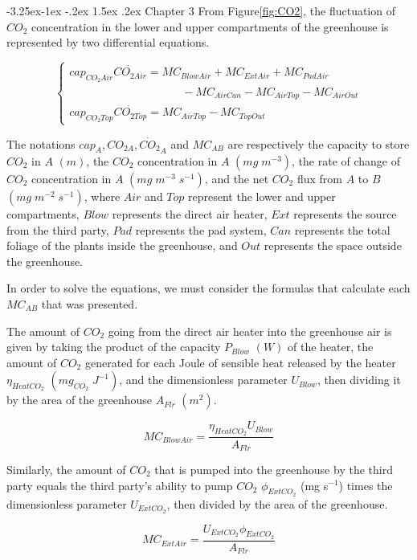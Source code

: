 \documentclass[a4paper]{article}
\makeatletter
\newcounter{subsubsubsection}[subsubsection]
\newcommand\subsubsubsection{\@startsection{subsubsubsection}{4}{\z@}%
                                     {-3.25ex\@plus-1ex \@minus-.2ex}%
                                     {1.5ex \@plus.2ex}%
                                     {\normalfont\normalsize\bfseries}}
\makeatother
\begin{document}
\subsubsubsection{Chapter 3}
From Figure{}\ref{fig:CO2}, the fluctuation of \(CO_2\) concentration in the lower and upper compartments of the greenhouse is represented by two differential equations.

\begin{equation}
  \begin{cases}
    cap_{CO_2 Air}\dot{CO_{2 Air}} = MC_{BlowAir} + MC_{ExtAir} + MC_{PadAir} \\ \qquad \qquad \qquad \qquad \qquad
    - MC_{AirCan} - MC_{AirTop} - MC_{AirOut}                                   \\
    cap_{CO_2 Top}\dot{CO_{2 Top}} = MC_{AirTop} - MC_{TopOut}
  \end{cases}
\end{equation}


The notations \(cap_A, CO_{2 A}, \dot{CO_2}_A\) and \(MC_{AB}\) are respectively the capacity to store \(CO_2\) in \(A\) \((m)\), the \(CO_2\) concentration in \(A\) \((mg\;m^{-3})\), the rate of change of \(CO_2\) concentration in \(A\) \((mg\;m^{-3}\;s^{-1})\), and the net \(CO_2\) flux from \(A\) to \(B\) \((mg\;m^{-2}\;s^{-1})\), where \(Air\) and \(Top\) represent the lower and upper compartments, \(Blow\) represents the direct air heater, \(Ext\) represents the source from the third party, \(Pad\) represents the pad system, \(Can\) represents the total foliage of the plants inside the greenhouse, and \(Out\) represents the space outside the greenhouse.

In order to solve the equations, we must consider the formulas that calculate each \(MC_{AB}\) that was presented.

The amount of \(CO_2\) going from the direct air heater into the greenhouse air is given by taking the product of the capacity \(P_{Blow}\) \((W)\) of the heater, the amount of \(CO_2\) generated for each Joule of sensible heat released by the heater \(\eta_{HeatCO_2}\) \((mg_{CO_2}\;J^{-1})\), and the dimensionless parameter \(U_{Blow}\), then dividing it by the area of the greenhouse \(A_{Flr}\) \((m^2)\).

\[MC_{BlowAir} = \frac{\eta_{HeatCO_2}U_{Blow}}{A_{Flr}}\]

Similarly, the amount of $CO_2$ that is pumped into the greenhouse by the third party equals the third party's ability to pump $CO_2$ $\phi_{ExtCO_2}$ (mg s$^{-1}$) times the dimensionless parameter $U_{ExtCO_2}$, then divided by the area of the greenhouse.

$$MC_{ExtAir} = \frac{U_{ExtCO_2}\phi_{ExtCO_2}}{A_{Flr}}$$
\end{document}
